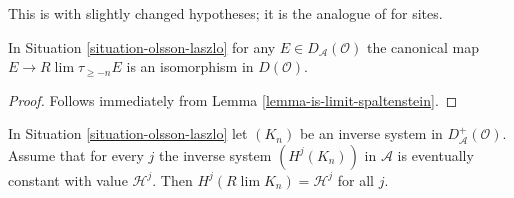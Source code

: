 \begin{lemma}
\label{lemma-olsson-laszlo}
\begin{reference}
This is \cite[Proposition 2.1.4]{six-I} with slightly changed
hypotheses; it is the analogue of \cite[Proposition 3.13]{Spaltenstein}
for sites.
\end{reference}
In Situation \ref{situation-olsson-laszlo} for any
$E \in D_\mathcal{A}(\mathcal{O})$ the canonical map
$E \to R\lim \tau_{\geq -n} E$
is an isomorphism in $D(\mathcal{O})$.
\end{lemma}

\begin{proof}
Follows immediately from Lemma \ref{lemma-is-limit-spaltenstein}.
\end{proof}

\begin{lemma}
\label{lemma-olsson-laszlo-modified}
In Situation \ref{situation-olsson-laszlo} let
$(K_n)$ be an inverse system in $D_\mathcal{A}^+(\mathcal{O})$.
Assume that for every $j$ the inverse system $(H^j(K_n))$
in $\mathcal{A}$ is eventually constant with value $\mathcal{H}^j$. Then
$H^j(R\lim K_n) = \mathcal{H}^j$ for all $j$.
\end{lemma}

